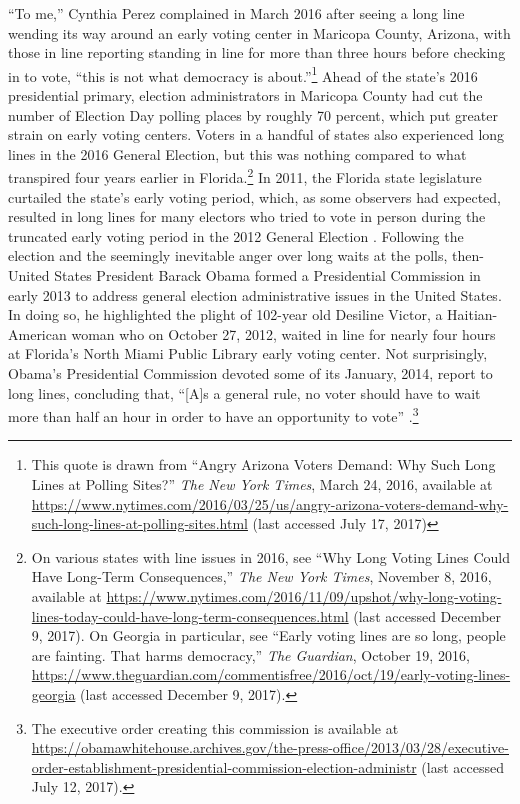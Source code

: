 \documentclass[12pt,titlepage]{article}
\begin{document}
``To me,'' Cynthia Perez complained in March 2016 after seeing a long
line wending its way around an early voting center in Maricopa County,
Arizona, with those in line reporting standing in line for more than
three hours before checking in to vote, ``this is not what democracy
is about.''\footnote{This quote is drawn from ``Angry Arizona Voters
  Demand: Why Such Long Lines at Polling Sites?'' \emph{The New York
    Times}, March 24, 2016, available at
  \url{https://www.nytimes.com/2016/03/25/us/angry-arizona-voters-demand-why-such-long-lines-at-polling-sites.html}
  (last accessed July 17, 2017)} Ahead of the state's 2016
presidential primary, election administrators in Maricopa County had
cut the number of Election Day polling places by roughly 70 percent,
which put greater strain on early voting centers. Voters in a handful
of states also experienced long lines in the 2016 General Election,
but this was nothing compared to what transpired four years earlier in
Florida.\footnote{On various states with line issues in 2016, see
  ``Why Long Voting Lines Could Have Long-Term Consequences,''
  \emph{The New York Times}, November 8, 2016, available at
  \url{https://www.nytimes.com/2016/11/09/upshot/why-long-voting-lines-today-could-have-long-term-consequences.html}
  (last accessed December 9, 2017).  On Georgia in particular, see
  ``Early voting lines are so long, people are fainting. That harms
  democracy,'' \emph{The Guardian}, October 19, 2016,
  \url{https://www.theguardian.com/commentisfree/2016/oct/19/early-voting-lines-georgia}
  (last accessed December 9, 2017).}  In 2011, the Florida state
legislature curtailed the state's early voting period, which, as some
observers had expected, resulted in long lines for many electors who
tried to vote in person during the truncated early voting period in
the 2012 General Election \citep{herron_smith2014}.  Following the
election and the seemingly inevitable anger over long waits at the
polls, then-United States President Barack Obama formed a Presidential
Commission in early 2013 to address general election administrative
issues in the United States.  In doing so, he highlighted the plight
of 102-year old Desiline Victor, a Haitian-American woman who on
October 27, 2012, waited in line for nearly four hours at Florida's
North Miami Public Library early voting center.  Not surprisingly,
Obama's Presidential Commission devoted some of its January, 2014,
report to long lines, concluding that, ``[A]s a general rule, no voter
should have to wait more than half an hour in order to have an
opportunity to vote'' \citep[p.\ 13,][]{pcea:2014}.\footnote{The
  executive order creating this commission is available at
  \url{https://obamawhitehouse.archives.gov/the-press-office/2013/03/28/executive-order-establishment-presidential-commission-election-administr}
  (last accessed July 12, 2017).}
\end{document}
